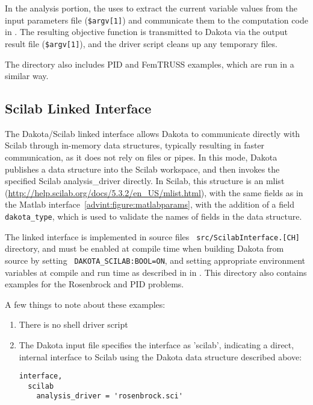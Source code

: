 In the analysis portion, the 
uses  to extract the current
variable values from the input parameters file (\texttt{\$argv[1]})
and communicate them to the computation code in
. The resulting objective function is
transmitted to Dakota via the output result file (\texttt{\$argv[1]}),
and the driver script cleans up any temporary files.

The directory also includes PID and FemTRUSS examples, which are run
in a similar way.

\subsection{Scilab Linked Interface} 

The Dakota/Scilab linked interface allows Dakota to communicate
directly with Scilab through in-memory data structures, typically
resulting in faster communication, as it does not rely on files or
pipes. In this mode, Dakota publishes a data structure into the
Scilab workspace, and then invokes the specified Scilab
analysis\_driver directly. In Scilab, this structure is an mlist
(\url{http://help.scilab.org/docs/5.3.2/en\_US/mlist.html}), with the same
fields as in the Matlab interface~\ref{advint:figure:matlabparams},
with the addition of a field {\tt dakota\_type}, which is used to validate
the names of fields in the data structure.

The linked interface is implemented in source files {\tt
  src/ScilabInterface.[CH]} directory, and must be enabled at compile
time when building Dakota from source by setting {\tt
  DAKOTA\_SCILAB:BOOL=ON}, and setting appropriate environment
variables at compile and run time as described in 
in . This directory also
contains examples for the Rosenbrock and PID problems.

A few things to note about these examples:
\begin{enumerate}
\item There is no shell driver script
\item The Dakota input file specifies the interface as 'scilab',
  indicating a direct, internal interface to Scilab using the Dakota
  data structure described above:
\begin{small}
\begin{verbatim}
interface,
  scilab
    analysis_driver = 'rosenbrock.sci'
\end{verbatim} 
\end{small}
\end{enumerate}


